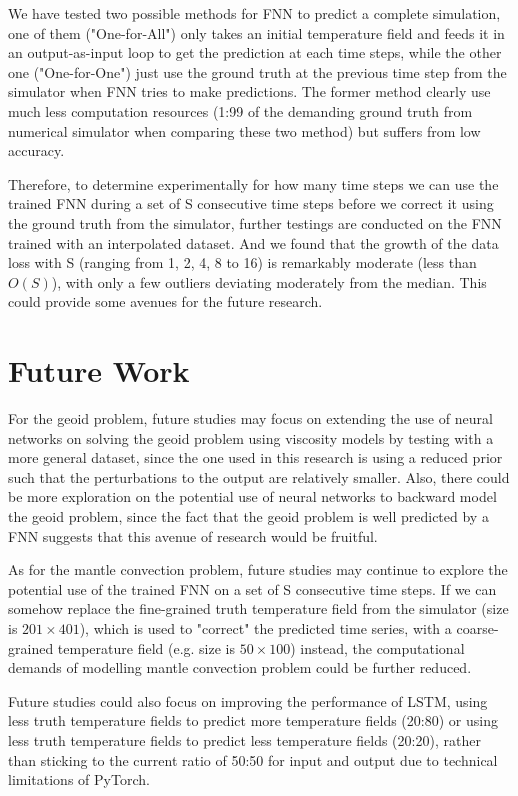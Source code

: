 We have tested two possible methods for FNN to predict a complete simulation, one of them ("One-for-All") only takes an initial temperature field and feeds it in an output-as-input loop to get the prediction at each time steps, while the other one ("One-for-One") just use the ground truth at the previous time step from the simulator when FNN tries to make predictions. The former method clearly use much less computation resources (1:99 of the demanding ground truth from numerical simulator when comparing these two method) but suffers from low accuracy.

Therefore, to determine experimentally for how many time steps we can use the trained FNN during a set of S consecutive time steps before we correct it using the ground truth from the simulator, further testings are conducted on the FNN trained with an interpolated dataset. And we found that the growth of the data loss with S (ranging from 1, 2, 4, 8 to 16) is remarkably moderate (less than $O(S)$), with only a few outliers deviating moderately from the median. This could provide some avenues for the future research.

\section{Future Work}

For the geoid problem, future studies may focus on extending the use of neural networks on solving the geoid problem using viscosity models by testing with a more general dataset, since the one used in this research is using a reduced prior such that the perturbations to the output are relatively smaller. Also, there could be more exploration on the potential use of neural networks to backward model the geoid problem, since the fact that the geoid problem is well predicted by a FNN suggests that this avenue of research would be fruitful.

As for the mantle convection problem, future studies may continue to explore the potential use of the trained FNN on a set of S consecutive time steps. If we can somehow replace the fine-grained truth temperature field from the simulator (size is $201 \times 401$), which is used to "correct" the predicted time series, with a coarse-grained temperature field (e.g. size is $50 \times 100$) instead, the computational demands of modelling mantle convection problem could be further reduced.

Future studies could also focus on improving the performance of LSTM, using less truth temperature fields to predict more temperature fields (20:80) or using less truth temperature fields to predict less temperature fields (20:20), rather than sticking to the current ratio of 50:50 for input and output due to technical limitations of PyTorch.

